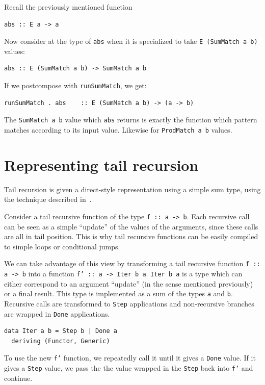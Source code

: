 \documentclass[runningheads, a4paper]{llncs}
\newcommand{\ttt}{\texttt}
\begin{document}
Recall the previously mentioned function

\begin{lstlisting}
abs :: E a -> a
\end{lstlisting}

\noindent Now consider at the type of \ttt{abs} when it is specialized to take
\ttt{E (SumMatch a b)} values:

\begin{lstlisting}
abs :: E (SumMatch a b) -> SumMatch a b
\end{lstlisting}

\noindent If we postcompose with \ttt{runSumMatch}, we get:

\begin{lstlisting}
runSumMatch . abs    :: E (SumMatch a b) -> (a -> b)
\end{lstlisting}

\noindent The \ttt{SumMatch a b} value which \ttt{abs} returns is exactly the function
which pattern matches according to its input value. Likewise for \ttt{ProdMatch a b} values.

\section{Representing tail recursion}
Tail recursion is given a direct-style representation using a simple sum type,
using the technique described in~\cite{Grebe:2017:RSD:3136040.3136048}.

Consider a tail recursive function of the type \ttt{f :: a -> b}. Each recursive
call can be seen as a simple ``update'' of the values of the arguments, since
these calls are all in tail position. This is why tail recursive functions
can be easily compiled to simple loops or conditional jumps.

We can take advantage of this view by transforming a tail recursive function
\ttt{f :: a -> b} into a function \ttt{f' :: a -> Iter b a}. \ttt{Iter b a} is a
type which can either correspond to an argument ``update'' (in the sense mentioned
previously) or a final result. This type is implemented as a sum of the types
\ttt{a} and \ttt{b}. Recursive calls are transformed to \ttt{Step} applications
and non-recursive branches are wrapped in \ttt{Done} applications.

\begin{lstlisting}
data Iter a b = Step b | Done a
  deriving (Functor, Generic)
\end{lstlisting}

\noindent To use the new \ttt{f'} function, we repeatedly call it until it gives a
\ttt{Done} value. If it gives a \ttt{Step} value, we pass the the value wrapped
in the \ttt{Step} back into \ttt{f'} and continue.
\end{document}
